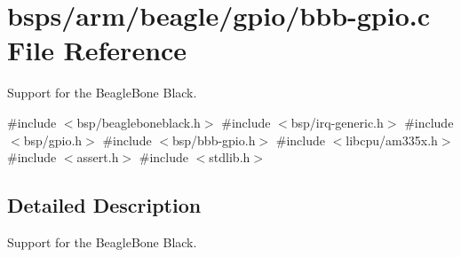 \hypertarget{bbb-gpio_8c}{}\section{bsps/arm/beagle/gpio/bbb-\/gpio.c File Reference}
\label{bbb-gpio_8c}


Support for the Beagle\+Bone Black.  


{\ttfamily \#include $<$bsp/beagleboneblack.\+h$>$}\newline
{\ttfamily \#include $<$bsp/irq-\/generic.\+h$>$}\newline
{\ttfamily \#include $<$bsp/gpio.\+h$>$}\newline
{\ttfamily \#include $<$bsp/bbb-\/gpio.\+h$>$}\newline
{\ttfamily \#include $<$libcpu/am335x.\+h$>$}\newline
{\ttfamily \#include $<$assert.\+h$>$}\newline
{\ttfamily \#include $<$stdlib.\+h$>$}\newline


\subsection{Detailed Description}
Support for the Beagle\+Bone Black. 

